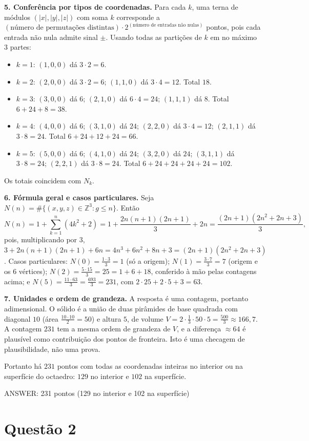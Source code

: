 \documentclass{article}%
\begin{document}
\textbf{5. Conferência por tipos de coordenadas.} Para cada $k$, uma terna de módulos $(|x|,|y|,|z|)$ com soma $k$ corresponde a $(\text{número de permutações distintas})\cdot 2^{(\text{número de entradas não nulas})}$ pontos, pois cada entrada não nula admite sinal $\pm$. Usando todas as partições de $k$ em no máximo $3$ partes:
\begin{itemize}
\item $k=1$: $(1,0,0)$ dá $3\cdot 2=6$.
\item $k=2$: $(2,0,0)$ dá $3\cdot 2=6$; $(1,1,0)$ dá $3\cdot 4=12$. Total $18$.
\item $k=3$: $(3,0,0)$ dá $6$; $(2,1,0)$ dá $6\cdot 4=24$; $(1,1,1)$ dá $8$. Total $6+24+8=38$.
\item $k=4$: $(4,0,0)$ dá $6$; $(3,1,0)$ dá $24$; $(2,2,0)$ dá $3\cdot 4=12$; $(2,1,1)$ dá $3\cdot 8=24$. Total $6+24+12+24=66$.
\item $k=5$: $(5,0,0)$ dá $6$; $(4,1,0)$ dá $24$; $(3,2,0)$ dá $24$; $(3,1,1)$ dá $3\cdot 8=24$; $(2,2,1)$ dá $3\cdot 8=24$. Total $6+24+24+24+24=102$.
\end{itemize}
Os totais coincidem com $N_k$.

\textbf{6. Fórmula geral e casos particulares.} Seja $N(n)=\#\{(x,y,z)\in\mathbb{Z}^3 : g\le n\}$. Então
\[
N(n)=1+\sum_{k=1}^{n}(4k^2+2)=1+\frac{2n(n+1)(2n+1)}{3}+2n=\frac{(2n+1)(2n^2+2n+3)}{3},
\]
pois, multiplicando por $3$, $3+2n(n+1)(2n+1)+6n=4n^3+6n^2+8n+3=(2n+1)(2n^2+2n+3)$.
Casos particulares: $N(0)=\frac{1\cdot 3}{3}=1$ (só a origem); $N(1)=\frac{3\cdot 7}{3}=7$ (origem e os 6 vértices); $N(2)=\frac{5\cdot 15}{3}=25=1+6+18$, conferido à mão pelas contagens acima; e $N(5)=\frac{11\cdot 63}{3}=\frac{693}{3}=231$, com $2\cdot 25+2\cdot 5+3=63$.

\textbf{7. Unidades e ordem de grandeza.} A resposta é uma contagem, portanto adimensional. O sólido é a união de duas pirâmides de base quadrada com diagonal $10$ (área $\frac{10\cdot 10}{2}=50$) e altura $5$, de volume $V=2\cdot\frac13\cdot 50\cdot 5=\frac{500}{3}\approx 166{,}7$. A contagem $231$ tem a mesma ordem de grandeza de $V$, e a diferença $\approx 64$ é plausível como contribuição dos pontos de fronteira. Isto é uma checagem de plausibilidade, não uma prova.

Portanto há $231$ pontos com todas as coordenadas inteiras no interior ou na superfície do octaedro: $129$ no interior e $102$ na superfície.

ANSWER: 231 pontos (129 no interior e 102 na superfície)%
\newpage%
\section*{Questão 2}
\end{document}
